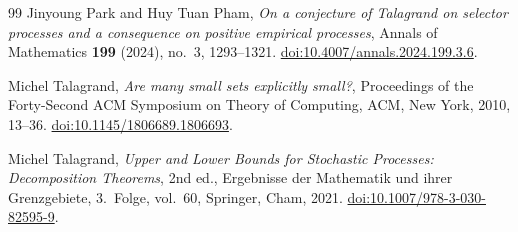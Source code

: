 \documentclass[11pt,letterpaper]{article}
\theoremstyle{definition}
\theoremstyle{remark}
\numberwithin{equation}{section}
\begin{document}
\begin{thebibliography}{99}
Jinyoung Park and Huy Tuan Pham,
\emph{On a conjecture of Talagrand on selector processes and a consequence
on positive empirical processes},
Annals of Mathematics \textbf{199} (2024), no.~3, 1293--1321.
\href{https://doi.org/10.4007/annals.2024.199.3.6}{doi:10.4007/annals.2024.199.3.6}.

Michel Talagrand,
\emph{Are many small sets explicitly small?},
Proceedings of the Forty-Second ACM Symposium on Theory of Computing,
ACM, New York, 2010, 13--36.
\href{https://doi.org/10.1145/1806689.1806693}{doi:10.1145/1806689.1806693}.

Michel Talagrand,
\emph{Upper and Lower Bounds for Stochastic Processes:
Decomposition Theorems},
2nd ed., Ergebnisse der Mathematik und ihrer Grenzgebiete, 3.~Folge,
vol.~60, Springer, Cham, 2021.
\href{https://doi.org/10.1007/978-3-030-82595-9}{doi:10.1007/978-3-030-82595-9}.

\end{thebibliography}
\end{document}
